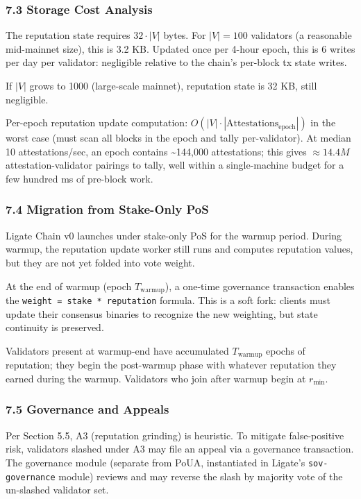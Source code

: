\documentclass[
  11pt,
]{article}
\begin{document}
\subsubsection{7.3 Storage Cost Analysis}\label{storage-cost-analysis}

The reputation state requires \(32 \cdot |V|\) bytes. For \(|V| = 100\)
validators (a reasonable mid-mainnet size), this is 3.2 KB. Updated once
per 4-hour epoch, this is 6 writes per day per validator: negligible
relative to the chain's per-block tx state writes.

If \(|V|\) grows to 1000 (large-scale mainnet), reputation state is 32
KB, still negligible.

Per-epoch reputation update computation:
\(O(|V| \cdot |\text{Attestations}_\text{epoch}|)\) in the worst case
(must scan all blocks in the epoch and tally per-validator). At median
10 attestations/sec, an epoch contains \textasciitilde144,000
attestations; this gives \(\approx 14.4M\) attestation-validator
pairings to tally, well within a single-machine budget for a few hundred
ms of pre-block work.

\subsubsection{7.4 Migration from Stake-Only
PoS}\label{migration-from-stake-only-pos}

Ligate Chain v0 launches under stake-only PoS for the warmup period.
During warmup, the reputation update worker still runs and computes
reputation values, but they are not yet folded into vote weight.

At the end of warmup (epoch \(T_{\text{warmup}}\)), a one-time
governance transaction enables the
\texttt{weight\ =\ stake\ *\ reputation} formula. This is a soft fork:
clients must update their consensus binaries to recognize the new
weighting, but state continuity is preserved.

Validators present at warmup-end have accumulated \(T_{\text{warmup}}\)
epochs of reputation; they begin the post-warmup phase with whatever
reputation they earned during the warmup. Validators who join after
warmup begin at \(r_{\min}\).

\subsubsection{7.5 Governance and Appeals}\label{governance-and-appeals}

Per Section 5.5, A3 (reputation grinding) is heuristic. To mitigate
false-positive risk, validators slashed under A3 may file an appeal via
a governance transaction. The governance module (separate from PoUA,
instantiated in Ligate's \texttt{sov-governance} module) reviews and may
reverse the slash by majority vote of the un-slashed validator set.
\end{document}
